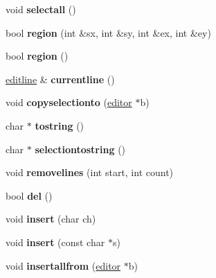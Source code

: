 \begin{DoxyCompactItemize}
void {\bfseries selectall} ()
\item 
\mbox{\label{structeditor_a2b2e4cd80ab8e735ce72c5bb0086dff5}} 
bool {\bfseries region} (int \&sx, int \&sy, int \&ex, int \&ey)
\item 
\mbox{\label{structeditor_af206725c53188ae8c71057b04a6966bd}} 
bool {\bfseries region} ()
\item 
\mbox{\label{structeditor_a044ffeb175cc4f070ad48c3d9d789cd6}} 
\hyperlink{structeditline}{editline} \& {\bfseries currentline} ()
\item 
\mbox{\label{structeditor_a332d998647823fe5429dc9f431dac87b}} 
void {\bfseries copyselectionto} (\hyperlink{structeditor}{editor} $\ast$b)
\item 
\mbox{\label{structeditor_a67c852303cea937e79f07b85e43851de}} 
char $\ast$ {\bfseries tostring} ()
\item 
\mbox{\label{structeditor_a6f1384db9c58b4b3758aa89dd55d05df}} 
char $\ast$ {\bfseries selectiontostring} ()
\item 
\mbox{\label{structeditor_a65463dc6d9210bdb69be40f63a0a7ffe}} 
void {\bfseries removelines} (int start, int count)
\item 
\mbox{\label{structeditor_ab456c9f04564795c90f52c3ecb2b22d0}} 
bool {\bfseries del} ()
\item 
\mbox{\label{structeditor_a9d79191f8b3ccddccd8b083ad0a9e3dd}} 
void {\bfseries insert} (char ch)
\item 
\mbox{\label{structeditor_a382e17bd2853bec918fdd8158ddc0c0d}} 
void {\bfseries insert} (const char $\ast$s)
\item 
\mbox{\label{structeditor_a4524cdbc7b3bcc631c85c3d1fd89fa99}} 
void {\bfseries insertallfrom} (\hyperlink{structeditor}{editor} $\ast$b)
\item 
\mbox{\label{structeditor_a0891d5a364871c199fe38e3c2e85815f}} 

\end{DoxyCompactItemize}
